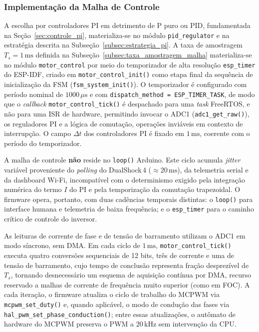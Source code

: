 \subsubsection{Implementação da Malha de Controle}
\label{subsec:implementacao_malha}

A escolha por controladores PI em detrimento de P puro ou PID, fundamentada na Seção~\ref{sec:controle_pi}, materializa-se no módulo \texttt{pid\_regulator} e na estratégia descrita na Subseção~\ref{subsec:estrategia_pi}. A taxa de amostragem $T_s = 1\,\text{ms}$ definida na Subseção~\ref{subsec:taxa_amostragem_malha} materializa-se no módulo \texttt{motor\_control} por meio do temporizador de alta resolução \texttt{esp\_timer} do ESP-IDF, criado em \texttt{motor\_control\_init()} como etapa final da sequência de inicialização da FSM (\texttt{fsm\_system\_init()}). O temporizador é configurado com período nominal de $1000\,\mu\text{s}$ e com \texttt{dispatch\_method = ESP\_TIMER\_TASK}, de modo que o \textit{callback} \texttt{motor\_control\_tick()} é despachado para uma \textit{task} FreeRTOS, e não para uma ISR de hardware, permitindo invocar o ADC1 (\texttt{adc1\_get\_raw()}), os reguladores PI e a lógica de comutação, operações inviáveis em contexto de interrupção. O campo $\Delta t$ dos controladores PI é fixado em $1\,\text{ms}$, coerente com o período do temporizador.

A malha de controle \textbf{não} reside no \texttt{loop()} Arduino. Este ciclo acumula \textit{jitter} variável proveniente do \textit{polling} do DualShock\,4 ($\approx 20\,\text{ms}$), da telemetria serial e da dashboard Wi-Fi, incompatível com o determinismo exigido pela integração numérica do termo $I$ do PI e pela temporização da comutação trapezoidal. O firmware opera, portanto, com duas cadências temporais distintas: o \texttt{loop()} para interface humana e telemetria de baixa frequência; e o \texttt{esp\_timer} para o caminho crítico de controle do inversor.

As leituras de corrente de fase e de tensão de barramento utilizam o ADC1 em modo síncrono, sem DMA. Em cada ciclo de $1\,\text{ms}$, \texttt{motor\_control\_tick()} executa quatro conversões sequenciais de 12 bits, três de corrente e uma de tensão de barramento, cujo tempo de conclusão representa fração desprezível de $T_s$, tornando desnecessário um esquema de aquisição contínua por DMA, recurso reservado a malhas de corrente de frequência muito superior (como em FOC). A cada iteração, o firmware atualiza o ciclo de trabalho do MCPWM via \texttt{mcpwm\_set\_duty()} e, quando aplicável, o modo de condução das fases via \texttt{hal\_pwm\_set\_phase\_conduction()}; entre essas atualizações, o autômato de hardware do MCPWM preserva o PWM a $20\,\text{kHz}$ sem intervenção da CPU.

